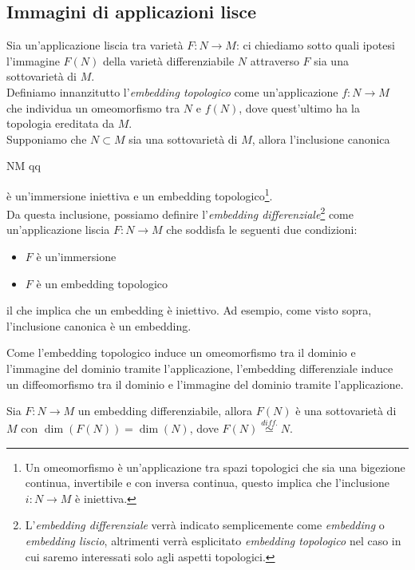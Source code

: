 \subsection{Immagini di applicazioni lisce}\label{s-sec:img-smooth-app}

Sia un'applicazione liscia tra varietà $ F : N \to M $: ci chiediamo sotto quali ipotesi l'immagine $ F(N) $ della varietà differenziabile $ N $ attraverso $ F $ sia una sottovarietà di $ M $. \\
Definiamo innanzitutto l'\textit{embedding topologico} come un'applicazione $ f : N \to M $ che individua un omeomorfismo tra $ N $ e $ f(N) $, dove quest'ultimo ha la topologia ereditata da $ M $. \\
Supponiamo che $ N \subset M $ sia una sottovarietà di $ M $, allora l'inclusione canonica

	{N}{M}
	{q}{q}

è un'immersione iniettiva e un embedding topologico\footnote{%
	Un omeomorfismo è un'applicazione tra spazi topologici che sia una bigezione continua, invertibile e con inversa continua, questo implica che l'inclusione $ i : N \to M $ è iniettiva.%
}. \\
Da questa inclusione, possiamo definire l'\textit{embedding differenziale}\footnote{%
	L'\textit{embedding differenziale} verrà indicato semplicemente come \textit{embedding} o \textit{embedding liscio}, altrimenti verrà esplicitato \textit{embedding topologico} nel caso in cui saremo interessati solo agli aspetti topologici.%
} come un'applicazione liscia $ F : N \to M $ che soddisfa le seguenti due condizioni:

\begin{itemize}
	\item $ F $ è un'immersione
	
	\item $ F $ è un embedding topologico
\end{itemize}

il che implica che un embedding è iniettivo. Ad esempio, come visto sopra, l'inclusione canonica è un embedding.

\begin{remark}
	Come l'embedding topologico induce un omeomorfismo tra il dominio e l'immagine del dominio tramite l'applicazione, l'embedding differenziale induce un diffeomorfismo tra il dominio e l'immagine del dominio tramite l'applicazione.
\end{remark}

\begin{theorem}\label{thm:emb-subvar}
	Sia $ F : N \to M $ un embedding differenziabile, allora $ F(N) $ è una sottovarietà di $ M $ con $ \dim(F(N)) = \dim(N) $, dove $ F(N) \stackrel{diff.}{\simeq} N $.
\end{theorem}

